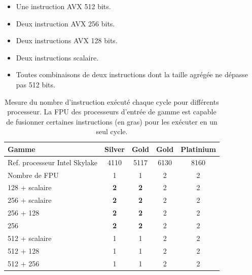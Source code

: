         \begin{itemize}
            \item Une instruction AVX 512 bits.
            \item Deux instruction AVX 256 bits.
            \item Deux instructions AVX 128 bits.
            \item Deux instructions scalaire.
            \item Toutes combinaisons de deux instructions dont la taille agrégée ne dépasse pas 512 bits.
        \end{itemize}
        
        
        \begin{table}[h!]
        \normalsize
        \centering
        \begin{tabular}{|l|c|c|c|c|}
            \hline
            \rowcolor[HTML]{EFEFEF} 
            Gamme & Silver & Gold & Gold & Platinium \\ \hline
            \rowcolor[HTML]{EFEFEF} 
            Ref. processeur Intel Skylake & 4110 & 5117 & 6130 & 8160 \\ \hline
            \rowcolor[HTML]{EFEFEF} 
            Nombre de FPU & 1 & 1 & 2 & 2 \\ \hline
            128 + scalaire & \textbf{2} & \textbf{2} & 2 & 2 \\ \hline
            256 + scalaire & \textbf{2} & \textbf{2} & 2 & 2 \\ \hline
            256 + 128 & \textbf{2} & \textbf{2} & 2 & 2 \\ \hline
            256 & \textbf{2} & \textbf{2} & 2 & 2 \\ \hline
            512 + scalaire & 1 & 1 & 2 & 2 \\ \hline
            512 + 128 & 1 & 1 & 2 & 2 \\ \hline
            512 + 256 & 1 & 1 & 2 & 2 \\ \hline
        
        \end{tabular}
        \caption{Mesure du nombre d'instruction exécuté chaque cycle pour différents processeur. La FPU des processeurs d'entrée de gamme est capable de fusionner certaines instructions (en gras) pour les exécuter en un seul cycle.}
        \label{res:skl}
        \end{table}
        
